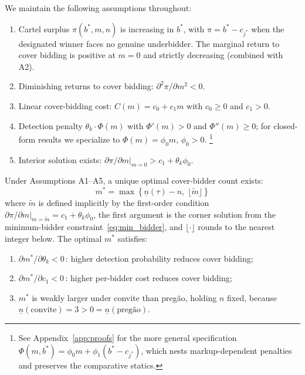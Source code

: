 \noindent We maintain the following assumptions throughout:

\begin{enumerate}
  \item[\textbf{A1.}] Cartel surplus $\pi(b^*, m, n)$ is increasing in $b^*$, with $\pi = b^* - c_{j^*}$ when the designated winner faces no genuine underbidder. The marginal return to cover bidding is positive at $m = 0$ and strictly decreasing (combined with A2).
  \item[\textbf{A2.}] Diminishing returns to cover bidding: $\partial^2 \pi / \partial m^2 < 0$.
  \item[\textbf{A3.}] Linear cover-bidding cost: $C(m) = c_0 + c_1 m$ with $c_0 \geq 0$ and $c_1 > 0$.
  \item[\textbf{A4.}] Detection penalty $\theta_k \cdot \Phi(m)$ with $\Phi'(m) > 0$ and $\Phi''(m) \geq 0$; for closed-form results we specialize to $\Phi(m) = \phi_0 m$, $\phi_0 > 0$.%
    \footnote{See Appendix~\ref{app:proofs} for the more general specification $\Phi(m, b^*) = \phi_0 m + \phi_1 (b^* - c_{j^*})$, which nests markup-dependent penalties and preserves the comparative statics.}
  \item[\textbf{A5.}] Interior solution exists: $\partial \pi / \partial m \big|_{m=0} > c_1 + \theta_k \phi_0$.
\end{enumerate}

\begin{proposition}
\label{prop:optimal_m}
Under Assumptions A1--A5, a unique optimal cover-bidder count exists:
\begin{equation}
  m^* = \max\!\left\{\underline{n}(\tau) - n, \;
  \lfloor \tilde{m} \rfloor \right\}
  \label{eq:optimal_m}
\end{equation}
where $\tilde{m}$ is defined implicitly by the first-order condition
$\partial \pi / \partial m \big|_{m = \tilde{m}} = c_1 + \theta_k
\phi_0$, the first argument is the corner solution from the
minimum-bidder constraint~\eqref{eq:min_bidder}, and $\lfloor \cdot
\rfloor$ rounds to the nearest integer below. The optimal $m^*$
satisfies:
\begin{enumerate}
  \item[(i)] $\partial m^* / \partial \theta_k < 0$\,: higher detection
    probability reduces cover bidding;
  \item[(ii)] $\partial m^* / \partial c_1 < 0$\,: higher per-bidder
    cost reduces cover bidding;
  \item[(iii)] $m^*$ is weakly larger under convite than preg\~ao,
    holding $n$ fixed, because $\underline{n}(\text{convite}) = 3 >
    0 = \underline{n}(\text{preg\~ao})$.
\end{enumerate}
\end{proposition}

